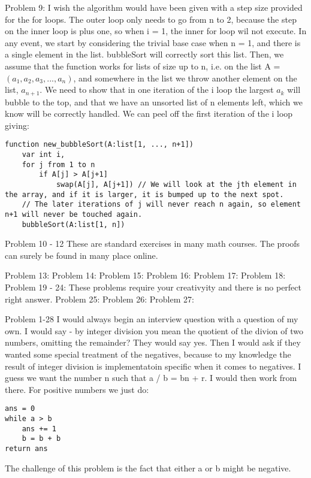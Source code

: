 Problem 9:
I wish the algorithm would have been given with a step size provided for the for loops. The outer loop only needs to go from n to 2, because the step on the inner loop is plus one, so when i = 1, the inner for loop wil not execute. In any event, 
we start by considering the trivial base case when n = 1, and there is a single element in the list. bubbleSort will correctly sort this list. Then, we assume that the function works for lists of size up to n, i.e. on the list A = $(a_1, a_2, a_3, ..., a_n )$, and somewhere in the list we throw another element on the list, $a_{n+1}$.  We need to show that in one iteration of the i loop the largest $a_k$ will bubble to the top, and that we have an unsorted list of n elements left, which we know will be correctly handled.
We can peel off the first iteration of the i loop giving:
\begin{lstlisting}
function new_bubbleSort(A:list[1, ..., n+1])
	var int i, 
	for j from 1 to n
		if A[j] > A[j+1]
			swap(A[j], A[j+1]) // We will look at the jth element in the array, and if it is larger, it is bumped up to the next spot. 
	// The later iterations of j will never reach n again, so element n+1 will never be touched again. 
	bubbleSort(A:list[1, n])
\end{lstlisting}

Problem 10 - 12
These are standard exercises in many math courses. The proofs can surely be found in many place online.


Problem 13:
Problem 14:
Problem 15:
Problem 16:
Problem 17:
Problem 18:
Problem 19 - 24:
These problems require your creativyity and there is no perfect right answer.
Problem 25:
Problem 26:
Problem 27:

Problem 1-28
I would always begin an interview question with a question of my own. I would say - by integer division you mean the quotient of the divion of two numbers, omitting the remainder? They would say yes. Then I would ask if they wanted some special treatment of the negatives, because to my knowledge the result of integer division is implementatoin specific when it comes to negatives.
I guess we want the number n such that a /  b = bn + r. I would then work from there. 
For positive numbers we just do: 
\begin{lstlisting}
ans = 0
while a > b
	ans += 1
	b = b + b
return ans
\end{lstlisting}

The challenge of this problem is the fact that either a or b might be negative.

